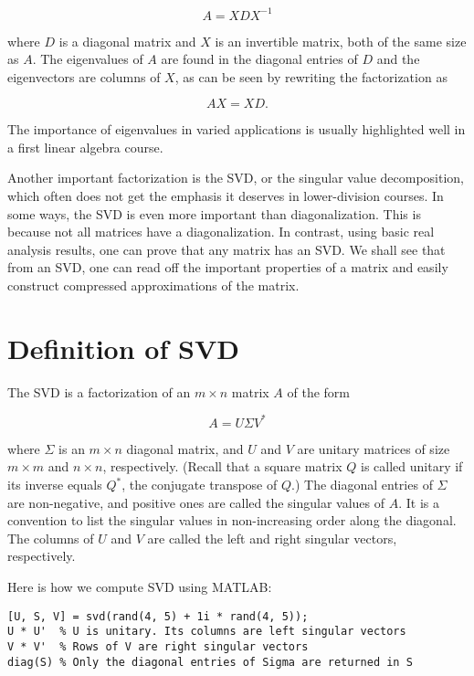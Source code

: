 \documentclass{ximera}
\begin{document}
\begin{problem}
\begin{problem}
\[
A = X D X^{-1}
\]

where \( D \) is a diagonal matrix and \( X \) is an invertible matrix, both of the same size as \( A \). The eigenvalues of \( A \) are found in the diagonal entries of \( D \) and the eigenvectors are columns of \( X \), as can be seen by rewriting the factorization as

\[
A X = X D.
\]

The importance of eigenvalues in varied applications is usually highlighted well in a first linear algebra course.

Another important factorization is the SVD, or the singular value decomposition, which often does not get the emphasis it deserves in lower-division courses. In some ways, the SVD is even more important than diagonalization. This is because not all matrices have a diagonalization. In contrast, using basic real analysis results, one can prove that any matrix has an SVD. We shall see that from an SVD, one can read off the important properties of a matrix and easily construct compressed approximations of the matrix.

\section{Definition of SVD}

The SVD is a factorization of an \( m \times n \) matrix \( A \) of the form

\[
A = U \Sigma V^*
\]

where \( \Sigma \) is an \( m \times n \) diagonal matrix, and \( U \) and \( V \) are unitary matrices of size \( m \times m \) and \( n \times n \), respectively. (Recall that a square matrix \( Q \) is called unitary if its inverse equals \( Q^* \), the conjugate transpose of \( Q \).) The diagonal entries of \( \Sigma \) are non-negative, and positive ones are called the singular values of \( A \). It is a convention to list the singular values in non-increasing order along the diagonal. The columns of \( U \) and \( V \) are called the left and right singular vectors, respectively.

Here is how we compute SVD using MATLAB:

\begin{verbatim}
[U, S, V] = svd(rand(4, 5) + 1i * rand(4, 5));
U * U'  % U is unitary. Its columns are left singular vectors
V * V'  % Rows of V are right singular vectors
diag(S) % Only the diagonal entries of Sigma are returned in S
\end{verbatim}


\end{problem}
\end{problem}
\end{document}
